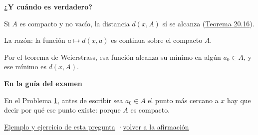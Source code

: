 \documentclass[11pt,a4paper]{article}
\newcommand{\bloque}[1]{\par\smallskip\noindent\textbf{\color{acento}#1}\par}
\begin{document}
\bloque{¿Y cuándo es verdadero?}
\begin{pasos}
\item[] Si $A$ es compacto y no vacío, la distancia $d(x,A)$ sí se alcanza (\href{https://decostruttivismo.github.io/MAT2514-repaso/pdf/MAT2514_apuntes_completos.pdf\#nameddest=teorema.20.16}{Teorema 20.16}).
\item[] La razón: la función $a\mapsto d(x,a)$ es continua sobre el compacto $A$.
\item[] Por el teorema de Weierstrass, esa función alcanza su mínimo en algún $a_0\in A$, y ese mínimo es $d(x,A)$.
\end{pasos}
\bloque{En la guía del examen}
\begin{pasos}
\item[] En el Problema \hyperlink{prob-1}{1}, antes de escribir \guillemotleft{}sea $a_0\in A$ el punto más cercano a $x$\guillemotright{} hay que decir por qué ese punto existe: porque $A$ es compacto.
\end{pasos}
\par{}
\par{\small \hyperlink{e-1}{Ejemplo y ejercicio de esta pregunta} \quad·\quad \hyperlink{q-1}{volver a la afirmación}}
\end{document}
